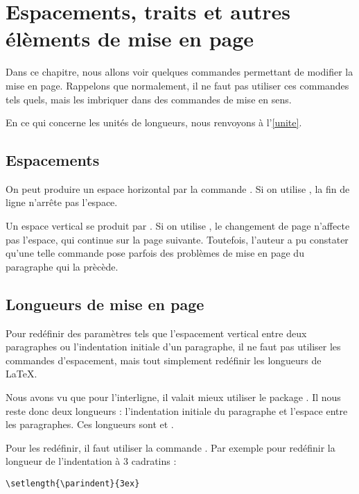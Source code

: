 \chapter{Espacements, traits et autres élèments de mise en page}

\begin{prealable}
Dans ce chapitre, nous allons voir quelques commandes permettant de modifier la mise en page.
Rappelons que normalement, il ne faut pas utiliser ces commandes tels quels, mais les imbriquer dans des commandes de mise en sens.

En ce qui concerne les unités de longueurs, nous renvoyons à l'\ref{unite}.
\end{prealable}

\section{Espacements}\label{espace}

On peut produire un espace horizontal par la commande . Si on utilise , la fin de ligne n'arrête pas l'espace.

Un espace vertical se produit par . Si on utilise , le changement de page n'affecte pas  l'espace, qui continue sur la page suivante. Toutefois, l'auteur a pu constater qu'une telle commande pose parfois des problèmes de mise en page du paragraphe qui la prècède.



\section{Longueurs de mise en page}

Pour redéfinir des paramètres tels que l'espacement vertical entre deux paragraphes ou l'indentation initiale d'un paragraphe, il ne faut pas utiliser les commandes d'espacement, mais tout simplement redéfinir les longueurs de \LaTeX. 

Nous avons vu que pour l'interligne, il valait mieux utiliser le package . Il nous reste donc deux longueurs : l'indentation initiale du paragraphe et l'espace entre les paragraphes. Ces longueurs sont  et .

Pour les redéfinir, il faut utiliser la commande . Par exemple pour redéfinir la longueur de l'indentation à 3 cadratins :
\begin{verbatim}
\setlength{\parindent}{3ex}
\end{verbatim}

